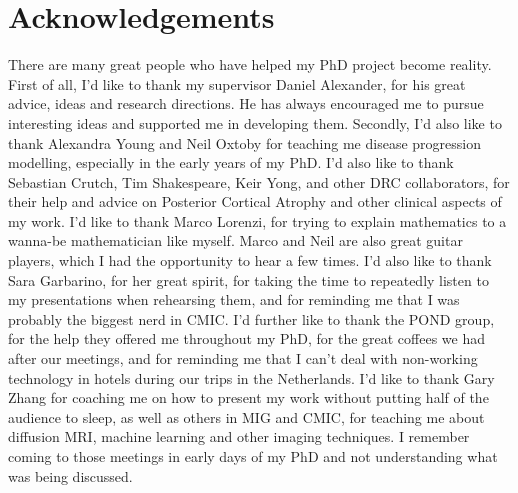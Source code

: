 \documentclass[12pt,a4paper,twoside]{book}
\begin{document}



\chapter*{Acknowledgements}
\thispagestyle{empty}


There are many great people who have helped my PhD project become reality. First of all, I'd like to thank my supervisor Daniel Alexander, for his great advice, ideas and research directions. He has always encouraged me to pursue interesting ideas and supported me in developing them. Secondly, I'd also like to thank Alexandra Young and Neil Oxtoby for teaching me disease progression modelling, especially in the early years of my PhD. I'd also like to thank Sebastian Crutch, Tim Shakespeare, Keir Yong, and other DRC collaborators, for their help and advice on Posterior Cortical Atrophy and other clinical aspects of my work. I'd like to thank Marco Lorenzi, for trying to explain mathematics to a wanna-be mathematician like myself. Marco and Neil are also great guitar players, which I had the opportunity to hear a few times. I'd also like to thank Sara Garbarino, for her great spirit, for taking the time to repeatedly listen to my presentations when rehearsing them, and for reminding me that I was probably the biggest nerd in CMIC. I'd further like to thank the POND group, for the help they offered me throughout my PhD, for the great coffees we had after our meetings, and for reminding me that I can't deal with non-working technology in hotels during our trips in the Netherlands. I'd like to thank Gary Zhang for coaching me on how to present my work without putting half of the audience to sleep, as well as others in MIG and CMIC, for teaching me about diffusion MRI, machine learning and other imaging techniques. I remember coming to those meetings in early days of my PhD and not understanding what was being discussed.
\end{document}
